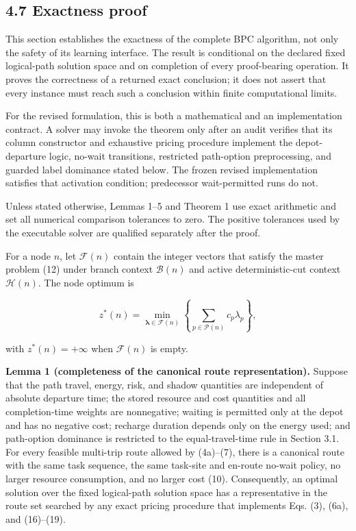 \documentclass[
  11pt,
]{article}
\begin{document}
\hypertarget{exactness-proof}{%
\subsection{4.7 Exactness proof}\label{exactness-proof}}

This section establishes the exactness of the complete BPC algorithm,
not only the safety of its learning interface. The result is conditional
on the declared fixed logical-path solution space and on completion of
every proof-bearing operation. It proves the correctness of a returned
exact conclusion; it does not assert that every instance must reach such
a conclusion within finite computational limits.

For the revised formulation, this is both a mathematical and an
implementation contract. A solver may invoke the theorem only after an
audit verifies that its column constructor and exhaustive pricing
procedure implement the depot-departure logic, no-wait transitions,
restricted path-option preprocessing, and guarded label dominance stated
below. The frozen revised implementation satisfies that activation
condition; predecessor wait-permitted runs do not.

Unless stated otherwise, Lemmas 1--5 and Theorem 1 use exact arithmetic
and set all numerical comparison tolerances to zero. The positive
tolerances used by the executable solver are qualified separately after
the proof.

For a node \(n\), let \(\mathcal{F}(n)\) contain the integer vectors
that satisfy the master problem (12) under branch context
\(\mathcal{B}(n)\) and active deterministic-cut context
\(\mathcal{H}(n)\). The node optimum is

\[
z^*(n)
=
\min_{\boldsymbol{\lambda}\in\mathcal{F}(n)}
\left\{
\sum_{p\in\mathcal{P}(n)}c_p\lambda_p
\right\},
\tag{24}
\]

with \(z^*(n)=+\infty\) when \(\mathcal{F}(n)\) is empty.

\textbf{Lemma 1 (completeness of the canonical route representation).}
Suppose that the path travel, energy, risk, and shadow quantities are
independent of absolute departure time; the stored resource and cost
quantities and all completion-time weights are nonnegative; waiting is
permitted only at the depot and has no negative cost; recharge duration
depends only on the energy used; and path-option dominance is restricted
to the equal-travel-time rule in Section 3.1. For every feasible
multi-trip route allowed by (4a)--(7), there is a canonical route with
the same task sequence, the same task-site and en-route no-wait policy,
no larger resource consumption, and no larger cost (10). Consequently,
an optimal solution over the fixed logical-path solution space has a
representative in the route set searched by any exact pricing procedure
that implements Eqs. (3), (6a), and (16)--(19).
\end{document}
